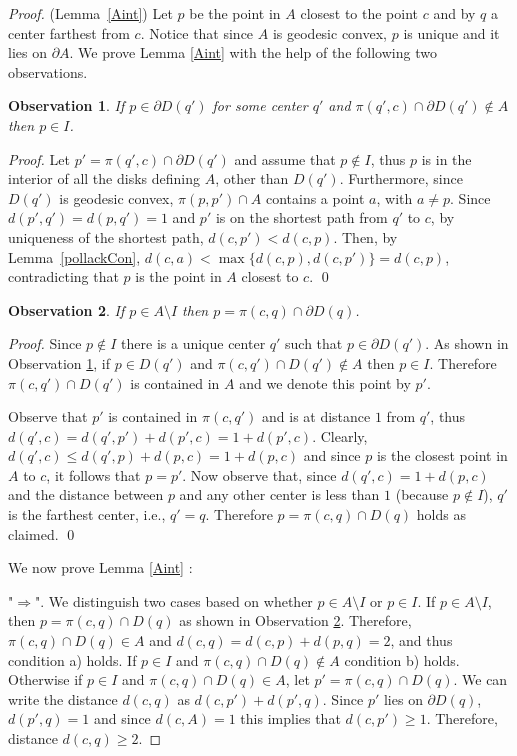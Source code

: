 \documentclass{llncs}
\newtheorem{obs}{Observation}
\begin{document}
\begin{proof}(Lemma~\ref{Aint})
Let $p$ be the point in $A$ closest to the point $c$ and by $q$ a center farthest from $c$. Notice that since $A$ is geodesic convex, $p$ is unique {and it lies on $\partial A$}.  We prove Lemma \ref{Aint} with the help of the following two observations.

\begin{obs}
If $p \in \partial D(q')$ for some center $q'$ and $\pi(q',c) \cap \partial D(q') \notin A$ then $p \in I$.
\label{PinI}
\end{obs}
\begin{proof}
Let $p' = \pi(q',c) \cap \partial D(q')$ and assume that $p\notin I$, thus $p$ is in the interior of all the disks defining $A$, other than $D(q')$. Furthermore,  since $D(q')$ is geodesic convex, $\pi(p, p') \cap A$ contains a point $a$, with $a \neq p$.  Since $d(p',q') = d(p, q') = 1$ and $p'$ is on the shortest path from $q'$ to $c$, by uniqueness of the shortest path, $d(c, p') < d(c, p)$.  Then, by Lemma~\ref{pollackCon}, $d(c, a) < \max\{d(c, p), d(c, p')\} = d(c, p)$, contradicting  that $p$ is the point in $A$ closest to $c$.  \qed
\end{proof}

\begin{obs}
If $p \in A\setminus I$ then $p = \pi(c, q) \cap \partial D(q)$. 
\label{PinA}
\end{obs}
\begin{proof}
Since $p \notin I$ there is a unique center $q'$ such that $p \in \partial D(q')$.    As shown in Observation \ref{PinI}, if $p \in D(q')$ and $\pi(c, q') \cap D(q') \notin A$ then $p \in I$. Therefore $\pi(c, q') \cap D(q')$ is contained in $A$ and we denote this point by $p'$.

Observe that $p'$ is contained in $\pi(c, q')$ and is at distance $1$ from $q'$, thus $d(q', c) = d(q', p') + d(p', c) = 1 + d(p', c)$.  Clearly,  $d(q',c) \leq d(q', p) + d(p, c) = 1 + d(p, c)$ and since $p$ is the closest point in $A$ to $c$, it follows that $p = p'$.  Now observe that, since $d(q', c) = 1 + d(p, c)$ and the distance between $p$ and any other center is less than $1$ (because $p \notin I$), $q'$ is the farthest center, i.e., $q' = q$.  Therefore  $p = \pi(c, q) \cap D(q)$ holds as claimed.  \qed
\end{proof}

We now prove Lemma \ref{Aint} :

"$\Rightarrow$".  We distinguish two cases based on whether $p\in A\setminus I$ or  $p\in I$.  If $p\in A \setminus I$, then $p = \pi(c, q) \cap D(q)$ as shown in Observation \ref{PinA}. Therefore, $\pi(c, q) \cap D(q) \in A$ and $d(c, q) = d(c, p) + d(p, q) = 2$, and thus condition a) holds.  If $p \in I$ and $\pi(c, q) \cap D(q) \notin A$ condition b) holds.  Otherwise if $p \in I$ and   $\pi(c, q) \cap D(q) \in A$, let $p' = \pi(c, q) \cap D(q)$. We can write the distance $d(c, q)$ as $d(c, p') + d(p', q)$. Since $p'$ lies on $\partial D(q)$, $d(p',q) = 1$ and since $d(c,A) = 1$ this implies that $d(c,p') \geq 1$. Therefore, distance $d(c,q) \geq 2$. 


\end{proof}
\end{document}
